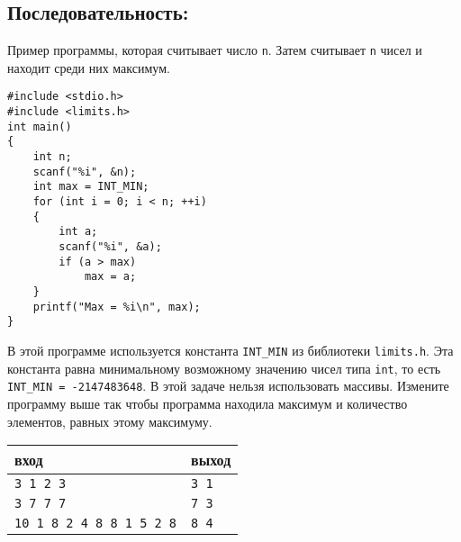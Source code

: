 \documentclass[10pt]{article}
\begin{document}
\subsection{Последовательность:} 
Пример программы, которая считывает число \texttt{n}. Затем считывает \texttt{n} чисел и находит среди них максимум. 

\begin{lstlisting}
#include <stdio.h>
#include <limits.h>
int main() 
{
    int n;
    scanf("%i", &n);
    int max = INT_MIN;
    for (int i = 0; i < n; ++i) 
    {
        int a;
        scanf("%i", &a);
        if (a > max)
            max = a;
    }
    printf("Max = %i\n", max);
}
\end{lstlisting}
В этой программе используется константа \texttt{INT\_MIN} из библиотеки \texttt{limits.h}. Эта константа равна минимальному возможному значению чисел типа \texttt{int}, то есть \texttt{INT\_MIN = -2147483648}. В этой задаче нельзя использовать массивы.
Измените программу выше так чтобы программа находила максимум и количество элементов, равных этому максимуму.
\begin{center}
\begin{tabular}{ l l }
 вход & выход \\ \hline
 \texttt{3 1 2 3} & \texttt{3 1}  \\ 
 \texttt{3 7 7 7} & \texttt{7 3}  \\
 \texttt{10 1 8 2 4 8 8 1 5 2 8} & \texttt{8 4}
\end{tabular}
\end{center}
\end{document}
